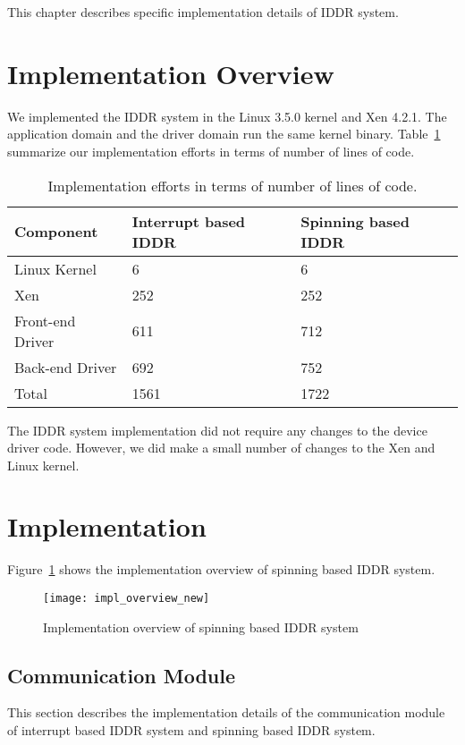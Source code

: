 This chapter describes specific implementation details of IDDR system.

\section{Implementation Overview} 
We implemented the IDDR system in the Linux 3.5.0 kernel and Xen 4.2.1. The application domain and the driver domain run the same kernel binary. Table~\ref{tab:base} summarize our implementation efforts in terms of number of lines of code.

\begin{table}
\caption{Implementation efforts in terms of number of lines of code.}
\begin{center}
\begin{tabular}{lll}
  \hline
  \label{tab:base}
  Component & Interrupt based IDDR & Spinning based IDDR \\
  \hline
  Linux Kernel & 6 & 6\\
  Xen & 252 & 252\\
  Front-end Driver & 611 & 712\\
  Back-end Driver & 692 & 752\\
  \hline 
  Total & 1561 & 1722\\
  \hline
\end{tabular}
\end{center}
\end{table}

The IDDR system implementation did not require any changes to the device driver code. However, we did make a small number of changes to the Xen and Linux kernel.

\section{Implementation}

Figure~\ref{fig:Implementation overview} shows the implementation overview of spinning based IDDR system.

\begin{figure}[!ht]
\centering
\texttt{[image: impl\_overview\_new]}
\caption{Implementation overview of spinning based IDDR system}
\label{fig:Implementation overview}
\end{figure}

\subsection{Communication Module}
This section describes the implementation details of the communication module of interrupt based IDDR system and spinning based IDDR system. 

